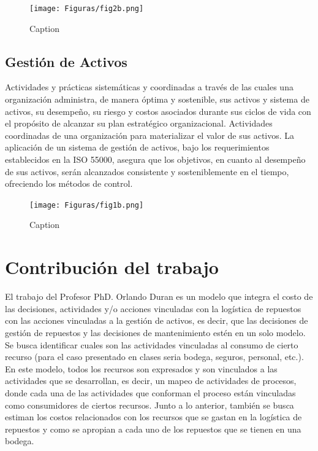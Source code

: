 \documentclass[]{article}
\begin{document}
\begin{figure}[!h]
    \centering
    \texttt{[image: Figuras/fig2b.png]}
    \caption{Caption}
    \label{fig:my_label}
\end{figure}


\subsection{Gestión de Activos}


Actividades y prácticas sistemáticas y coordinadas a través de las cuales una organización administra, de manera óptima y sostenible, sus activos y sistema de activos, su desempeño, su riesgo y costos asociados durante sus ciclos de vida con el propósito de alcanzar su plan estratégico organizacional. Actividades coordinadas de una organización para materializar el valor de sus activos.
La aplicación de un sistema de gestión de activos, bajo los requerimientos establecidos en la ISO 55000, asegura que los objetivos, en cuanto al desempeño de sus activos, serán alcanzados consistente y sosteniblemente en el tiempo, ofreciendo los métodos de control.\cite{amendola2003indicadores}

\begin{figure}[!h]
    \centering
    \texttt{[image: Figuras/fig1b.png]}
    \caption{Caption}
    \label{fig:my_label}
\end{figure}

\hypertarget{contribucion-del-trabajo-identificacion-del-aporte-que-se-hace}{%
\section{Contribución del trabajo}
\label{contribucion-del-trabajo-identificacion-del-aporte-que-se-hace}}
El trabajo del Profesor PhD. Orlando Duran es un modelo que integra el costo de las decisiones, actividades y/o acciones vinculadas con la logística de repuestos con las acciones vinculadas a la gestión de activos, es decir, que las decisiones de gestión de repuestos y las decisiones de mantenimiento estén en un solo modelo.
Se busca identificar cuales son las actividades vinculadas al consumo de cierto recurso (para el caso presentado en clases seria bodega, seguros, personal, etc.). En este modelo, todos los recursos son expresados y son vinculados a las actividades que se desarrollan, es decir, un mapeo de actividades de procesos, donde cada una de las actividades que conforman el proceso están vinculadas como consumidores de ciertos recursos.
Junto a lo anterior, también se busca estiman los costos relacionados con los recursos que se gastan en la logística de repuestos y como se apropian a cada uno de los repuestos que se tienen en una bodega. 
\end{document}
